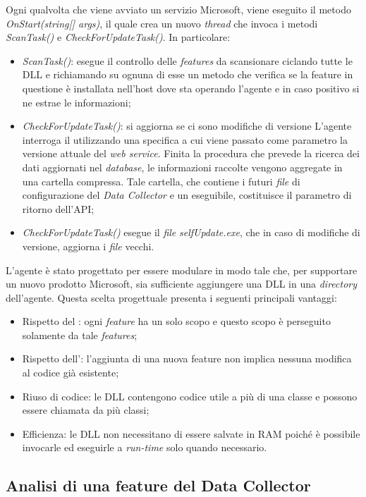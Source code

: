 Ogni qualvolta che viene avviato un servizio Microsoft, viene eseguito il metodo \emph{OnStart(string[] args)}, il quale crea un nuovo \emph{thread} che invoca i metodi \emph{ScanTask()} e \emph{CheckForUpdateTask()}. In particolare:
\begin{itemize}
    \item \emph{ScanTask()}: esegue il controllo delle \emph{features} da scansionare ciclando tutte le DLL e richiamando su ognuna di esse un metodo che verifica se la feature in questione è installata nell’host dove sta operando l’agente e in caso positivo si ne estrae le informazioni;
    \item \emph{CheckForUpdateTask()}: si aggiorna se ci sono modifiche di versione
    L’agente interroga il  utilizzando una specifica  a cui viene passato come parametro la versione attuale del \emph{web service}. Finita la procedura che prevede la ricerca dei dati aggiornati nel \emph{database}, le informazioni raccolte vengono aggregate in una cartella compressa. Tale cartella, che contiene i futuri \emph{file} di configurazione del \emph{Data Collector} e un eseguibile, costituisce il parametro di ritorno dell’API;
    \item \emph{CheckForUpdateTask()} esegue il \emph{file} \emph{selfUpdate.exe}, che in caso di modifiche di versione, aggiorna i \emph{file} vecchi.
\end{itemize}
L'agente è stato progettato per essere modulare in modo tale che, per supportare un nuovo prodotto Microsoft, sia sufficiente aggiungere una DLL in una \emph{directory} dell'agente.
Questa scelta progettuale presenta i seguenti principali vantaggi:
\begin{itemize}
    \item Rispetto del : ogni \emph{\emph{feature}} ha un solo scopo e questo scopo è perseguito solamente da tale \emph{features};
    \item Rispetto dell’: l’aggiunta di una nuova feature non implica nessuna modifica al codice già esistente;
    \item Riuso di codice: le DLL contengono codice utile a più di una classe e possono essere chiamata da più classi;
    \item Efficienza: le DLL non necessitano di essere salvate in RAM poiché è possibile invocarle ed eseguirle a \emph{run-time} solo quando necessario.
\end{itemize}

\subsection{Analisi di una feature del Data Collector}

